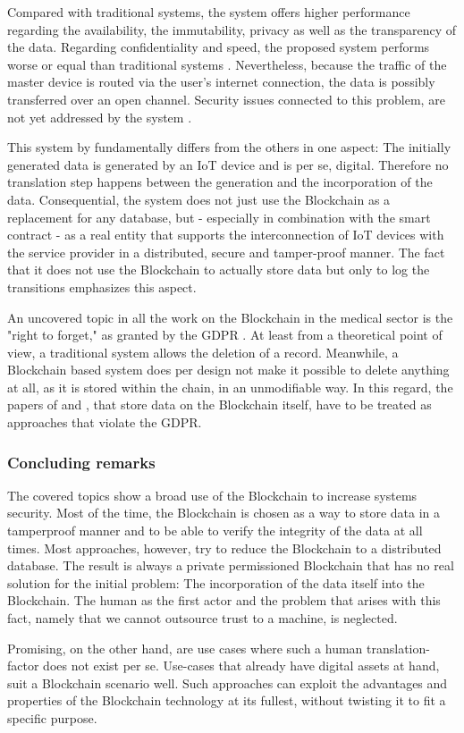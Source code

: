 Compared with traditional systems, the system offers higher performance regarding the availability, the immutability, privacy as well as the transparency of the data. Regarding confidentiality and speed, the proposed system performs worse or equal than traditional systems \cite{Baccarini2018}.
Nevertheless, because the traffic of the master device is routed via the user's internet connection, the data is possibly transferred over an open channel. Security issues connected to this problem, are not yet addressed by the system \cite{Baccarini2018}.

This system by \cite{Baccarini2018} fundamentally differs from the others in one aspect: The initially generated data is generated by an IoT device and is per se, digital. Therefore no translation step happens between the generation and the incorporation of the data.
Consequential, the system does not just use the Blockchain as a replacement for any database, but - especially in combination with the smart contract - as a real entity that supports the interconnection of IoT devices with the service provider in a distributed, secure and tamper-proof manner. The fact that it does not use the Blockchain to actually store data but only to log the transitions emphasizes this aspect.

An uncovered topic in all the work on the Blockchain in the medical sector is the "right to forget," as granted by the GDPR \cite{EuropeanCommission2017}. At least from a theoretical point of view, a traditional system allows the deletion of a record. Meanwhile, a Blockchain based system does per design not make it possible to delete anything at all, as it is stored within the chain, in an unmodifiable way. In this regard, the papers of \cite{Cao2019} and \cite{Azaria2016}, that store data on the Blockchain itself, have to be treated as approaches that violate the GDPR.

\subsubsection{Concluding remarks}
The covered topics show a broad use of the Blockchain to increase systems security. Most of the time, the Blockchain is chosen as a way to store data in a tamperproof manner and to be able to verify the integrity of the data at all times.
Most approaches, however, try to reduce the Blockchain to a distributed database. The result is always a private permissioned Blockchain that has no real solution for the initial problem: The incorporation of the data itself into the Blockchain. The human as the first actor and the problem that arises with this fact, namely that we cannot outsource trust to a machine, is neglected.

Promising, on the other hand, are use cases where such a human translation-factor does not exist per se. Use-cases that already have digital assets at hand, suit a Blockchain scenario well. Such approaches can exploit the advantages and properties of the Blockchain technology at its fullest, without twisting it to fit a specific purpose.
